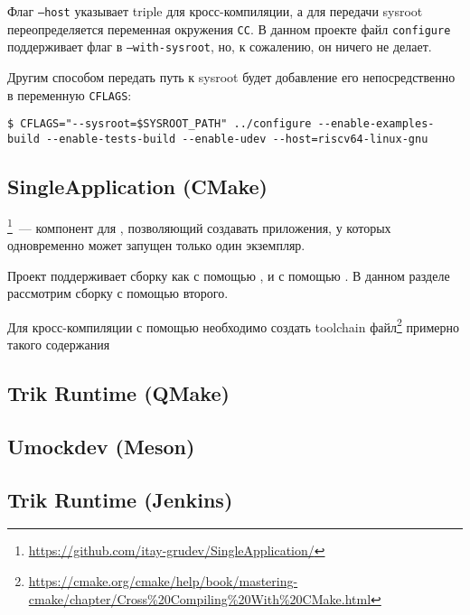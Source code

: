 Флаг \texttt{--host} указывает triple для кросс-компиляции, а для передачи sysroot переопределяется переменная окружения \texttt{CC}.
В данном проекте файл \texttt{configure} поддерживает флаг в \texttt{--with-sysroot}, но, к сожалению, он ничего не делает.

Другим способом передать путь к sysroot будет добавление его непосредственно в переменную \texttt{CFLAGS}:
\begin{verbatim}
$ CFLAGS="--sysroot=$SYSROOT_PATH" ../configure --enable-examples-build --enable-tests-build --enable-udev --host=riscv64-linux-gnu
\end{verbatim}

\subsection{SingleApplication (CMake)}

\singleapp{}\footnote{\url{https://github.com/itay-grudev/SingleApplication/}}~--- компонент для \qt{}, позволяющий создавать приложения, у которых одновременно может запущен только один экземпляр.

Проект поддерживает сборку как с помощью \qmake{}, и с помощью \cmake{}.
В данном разделе рассмотрим сборку с помощью второго.

Для кросс-компиляции с помощью \cmake{} необходимо создать toolchain файл\footnote{\url{https://cmake.org/cmake/help/book/mastering-cmake/chapter/Cross\%20Compiling\%20With\%20CMake.html}} примерно такого содержания



\subsection{Trik Runtime (QMake)}


\subsection{Umockdev (Meson)}


\subsection{Trik Runtime (Jenkins)}

